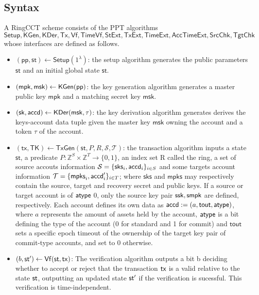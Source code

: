\subsection{Syntax}
\begin{definition}
    A RingCCT scheme consists of the PPT algorithms 
    \[\mathsf{Setup},\mathsf{KGen},\mathsf{KDer}, \mathsf{Tx},\mathsf{Vf},\mathsf{TimeVf}, \mathsf{StExt},\mathsf{TxExt}, \mathsf{TimeExt}, \mathsf{AccTimeExt}, \mathsf{SrcChk},\mathsf{TgtChk}\]
    whose interfaces are defined as follows.
    \begin{itemize}
        \item $(\mathsf{pp,st}) \gets \mathsf{Setup}(1^\lambda)$: the setup algorithm generates the public parameters $\mathsf{st}$ and an initial global state $\mathsf{st}$.
        \item $(\mathsf{mpk},\mathsf{msk}) \gets \mathsf{KGen}(\mathsf{pp})$: the key generation algorithm generates a master public key $\mathsf{mpk}$ and a matching secret key $\mathsf{msk}$.
        \item $(\mathsf{sk},\mathsf{accd}) \gets \mathsf{KDer}(\mathsf{msk, \tau})$: the key derivation algorithm generates derives the keys-account data tuple given the master key $\mathsf{msk}$ owning the account and a token $\tau$ of the account.
	    \item $(\mathsf{tx,TK}) \gets \mathsf{TxGen}(\mathsf{st},P,R,\mathcal{S},\mathcal{T})$: the transaction algorithm inputs a state $\mathsf{st}$, a predicate $P: \mathbb{Z}^S \times \mathbb{Z}^T \rightarrow \{0,1\}$, an index set R called the ring, a set of source accouts information $\mathcal{S} = \{\mathsf{sks}_i, \mathsf{accd}_i\}_{i\in S}$ and some targets account information $\mathcal{T} = \{\mathsf{mpks}_i, \mathsf{accd}'_i\}_{i\in T}$; where $\mathsf{sks}$ and $\mathsf{mpks}$ may respectively contain the source, target and recovery secret and public keys. If a source or target account is of $\mathsf{atype}$ 0, only the source key pair $\mathsf{ssk}, \mathsf{smpk}$ are defined, respectively. Each account defines its own data as $\mathsf{accd} := (a, \mathsf{tout}, \mathsf{atype})$, where $a$ represents the amount of assets held by the account, $\mathsf{atype}$ is a bit defining the type of the account (0 for standard and 1 for commit) and $\mathsf{tout}$ sets a specific epoch timeout of the ownership of the target key pair of commit-type accounts, and set to 0 otherwise. 
        \item $(b,\st') \gets \mathsf{Vf}(\st,\tx)$: The verification algorithm outputs a bit b deciding whether to accept or reject that the transaction $\mathsf{tx}$ is a valid relative to the state $\st$, outputting an updated state $\st'$ if the verification is sucessful. This verification is time-independent.

\end{itemize}
\end{definition}
